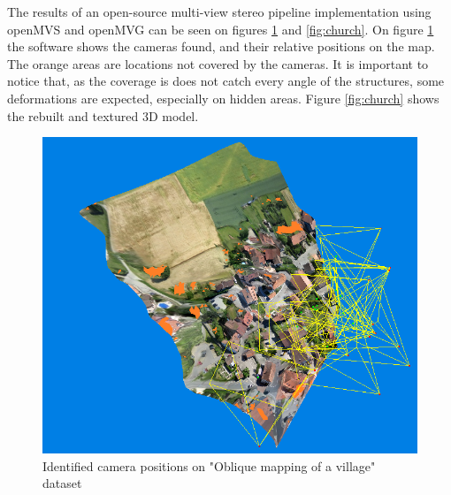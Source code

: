 The results of an open-source multi-view stereo pipeline implementation using openMVS\cite{openmvs} and openMVG\cite{openmvg} can be seen on figures \ref{fig:cameras} and \ref{fig:church}. 
%
On figure \ref{fig:cameras} the software shows the cameras found, and their relative positions on the map. 
%
The orange areas are locations not covered by the cameras. 
%
It is important to notice that, as the coverage is does not catch every angle of the structures, some deformations are expected, especially on hidden areas. 
%
Figure \ref{fig:church} shows the rebuilt and textured 3D model.
 
 \begin{figure}
\centering
  \includegraphics[width=\linewidth]{figs/cameras.png}
  \caption{Identified camera positions on "Oblique mapping of a village" dataset }
  \label{fig:cameras}
\end{figure}


